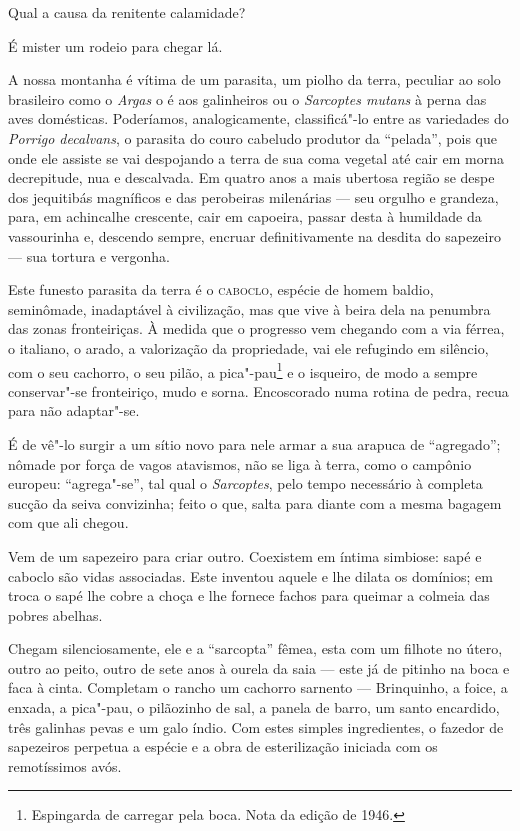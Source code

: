 Qual a causa da renitente calamidade?

É mister um rodeio para chegar lá.

A nossa montanha é vítima de um parasita, um piolho da terra, peculiar
ao solo brasileiro como o \emph{Argas} o é aos galinheiros ou o
\emph{Sarcoptes mutans} à perna das aves domésticas. Poderíamos,
analogicamente, classificá"-lo entre as variedades do \emph{Porrigo
decalvans}, o parasita do couro cabeludo produtor da ``pelada'', pois
que onde ele assiste se vai despojando a terra de sua coma vegetal até
cair em morna decrepitude, nua e descalvada. Em quatro anos a mais
ubertosa região se despe dos jequitibás magníficos e das perobeiras
milenárias --- seu orgulho e grandeza, para, em achincalhe crescente,
cair em capoeira, passar desta à humildade da vassourinha e, descendo
sempre, encruar definitivamente na desdita do sapezeiro --- sua tortura
e vergonha.

Este funesto parasita da terra é o \textsc{caboclo}, espécie de homem baldio,
seminômade, inadaptável à civilização, mas que vive à beira dela na
penumbra das zonas fronteiriças. À medida que o progresso vem chegando
com a via férrea, o italiano, o arado, a valorização da propriedade, vai
ele refugindo em silêncio, com o seu cachorro, o seu pilão, a
pica"-pau\footnote{Espingarda de carregar pela boca. Nota da edição de
  1946.} e o isqueiro, de modo a sempre conservar"-se fronteiriço, mudo e
sorna. Encoscorado numa rotina de pedra, recua para não adaptar"-se.

É de vê"-lo surgir a um sítio novo para nele armar a sua arapuca de
``agregado''; nômade por força de vagos atavismos, não se liga à terra,
como o campônio europeu: ``agrega"-se'', tal qual o \emph{Sarcoptes},
pelo tempo necessário à completa sucção da seiva convizinha; feito o
que, salta para diante com a mesma bagagem com que ali chegou.

Vem de um sapezeiro para criar outro. Coexistem em íntima simbiose: sapé
e caboclo são vidas associadas. Este inventou aquele e lhe dilata os
domínios; em troca o sapé lhe cobre a choça e lhe fornece fachos para
queimar a colmeia das pobres abelhas.

Chegam silenciosamente, ele e a ``sarcopta'' fêmea, esta com um filhote
no útero, outro ao peito, outro de sete anos à ourela da saia --- este
já de pitinho na boca e faca à cinta. Completam o rancho um cachorro
sarnento --- Brinquinho, a foice, a enxada, a pica"-pau, o pilãozinho de
sal, a panela de barro, um santo encardido, três galinhas pevas e um
galo índio. Com estes simples ingredientes, o fazedor de sapezeiros
perpetua a espécie e a obra de esterilização iniciada com os
remotíssimos avós.

